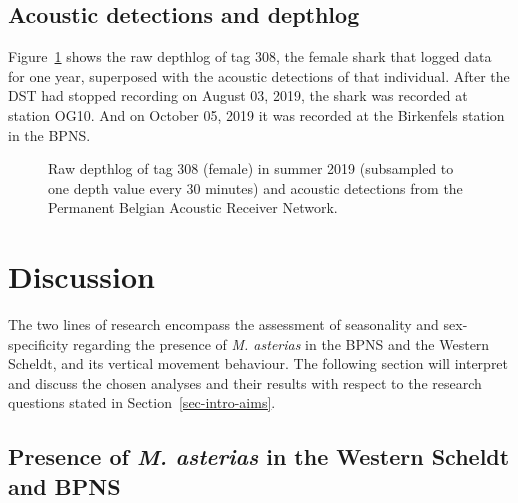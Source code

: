 \documentclass[
  authoryear,
  review,
  3p]{elsarticle}
\begin{document}
\hypertarget{acoustic-detections-and-depthlog}{%
\subsection{Acoustic detections and
depthlog}\label{acoustic-detections-and-depthlog}}

Figure~\ref{fig-adst308} shows the raw depthlog of tag 308, the female
shark that logged data for one year, superposed with the acoustic
detections of that individual. After the DST had stopped recording on
August 03, 2019, the shark was recorded at station OG10. And on October
05, 2019 it was recorded at the Birkenfels station in the BPNS.

\begin{figure}

\begin{minipage}[t]{\linewidth}

{\centering 


\caption{\label{fig-adst308}Raw depthlog of tag 308 (female) in summer
2019 (subsampled to one depth value every 30 minutes) and acoustic
detections from the Permanent Belgian Acoustic Receiver Network.}

}

\end{minipage}%

\end{figure}

\hypertarget{discussion}{%
\section{Discussion}\label{discussion}}

The two lines of research encompass the assessment of seasonality and
sex-specificity regarding the presence of \emph{M. asterias} in the BPNS
and the Western Scheldt, and its vertical movement behaviour. The
following section will interpret and discuss the chosen analyses and
their results with respect to the research questions stated in
Section~\ref{sec-intro-aims}.

\hypertarget{sec-disc-seasonalpresencefemales}{%
\subsection{\texorpdfstring{Presence of \emph{M. asterias} in the
Western Scheldt and
BPNS}{Presence of M. asterias in the Western Scheldt and BPNS}}\label{sec-disc-seasonalpresencefemales}}
\end{document}
